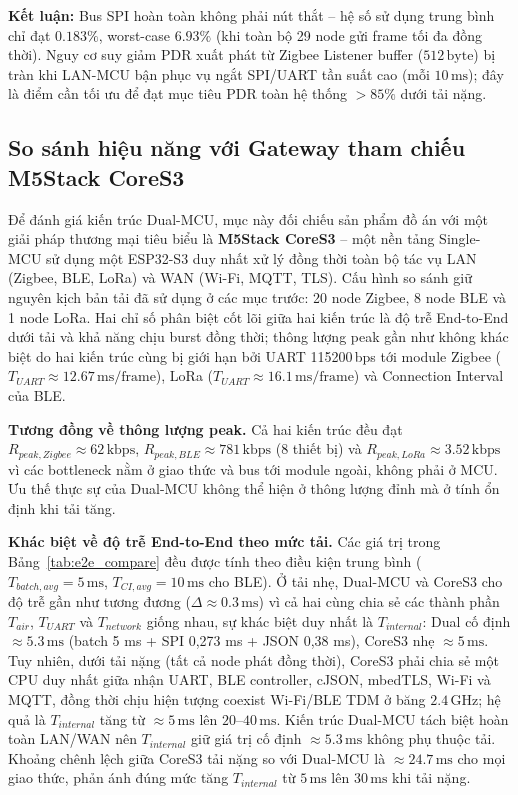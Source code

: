         \textbf{Kết luận:} Bus SPI hoàn toàn không phải nút thắt -- hệ số sử dụng trung bình chỉ đạt $0{.}183\%$, worst-case $6{.}93\%$ (khi toàn bộ 29 node gửi frame tối đa đồng thời). Nguy cơ suy giảm PDR xuất phát từ Zigbee Listener buffer ($512\,\text{byte}$) bị tràn khi LAN-MCU bận phục vụ ngắt SPI/UART tần suất cao (mỗi $10\,\text{ms}$); đây là điểm cần tối ưu để đạt mục tiêu PDR toàn hệ thống $> 85\%$ dưới tải nặng.
        
        \subsection{So sánh hiệu năng với Gateway tham chiếu M5Stack CoreS3}
        \label{subsec:perf_compare}
        
        Để đánh giá kiến trúc Dual-MCU, mục này đối chiếu sản phẩm đồ án với một giải pháp thương mại tiêu biểu là \textbf{M5Stack CoreS3} -- một nền tảng Single-MCU sử dụng một ESP32-S3 duy nhất xử lý đồng thời toàn bộ tác vụ LAN (Zigbee, BLE, LoRa) và WAN (Wi-Fi, MQTT, TLS). Cấu hình so sánh giữ nguyên kịch bản tải đã sử dụng ở các mục trước: 20 node Zigbee, 8 node BLE và 1 node LoRa. Hai chỉ số phân biệt cốt lõi giữa hai kiến trúc là độ trễ End-to-End dưới tải và khả năng chịu burst đồng thời; thông lượng peak gần như không khác biệt do hai kiến trúc cùng bị giới hạn bởi UART 115200\,bps tới module Zigbee ($T_{UART} \approx 12{.}67\,\text{ms/frame}$), LoRa ($T_{UART} \approx 16{.}1\,\text{ms/frame}$) và Connection Interval của BLE.
        
        \textbf{Tương đồng về thông lượng peak.} Cả hai kiến trúc đều đạt $R_{peak,Zigbee} \approx 62\,\text{kbps}$, $R_{peak,BLE} \approx 781\,\text{kbps}$ (8 thiết bị) và $R_{peak,LoRa} \approx 3{.}52\,\text{kbps}$ vì các bottleneck nằm ở giao thức và bus tới module ngoài, không phải ở MCU. Ưu thế thực sự của Dual-MCU không thể hiện ở thông lượng đỉnh mà ở tính ổn định khi tải tăng.
        
        \textbf{Khác biệt về độ trễ End-to-End theo mức tải.} Các giá trị trong Bảng~\ref{tab:e2e_compare} đều được tính theo điều kiện trung bình ($T_{batch,avg} = 5\,\text{ms}$, $T_{CI,avg} = 10\,\text{ms}$ cho BLE). Ở tải nhẹ, Dual-MCU và CoreS3 cho độ trễ gần như tương đương ($\Delta \approx 0{.}3\,\text{ms}$) vì cả hai cùng chia sẻ các thành phần $T_{air}$, $T_{UART}$ và $T_{network}$ giống nhau, sự khác biệt duy nhất là $T_{internal}$: Dual cố định $\approx 5{.}3\,\text{ms}$ (batch 5 ms + SPI 0,273 ms + JSON 0,38 ms), CoreS3 nhẹ $\approx 5\,\text{ms}$. Tuy nhiên, dưới tải nặng (tất cả node phát đồng thời), CoreS3 phải chia sẻ một CPU duy nhất giữa nhận UART, BLE controller, cJSON, mbedTLS, Wi-Fi và MQTT, đồng thời chịu hiện tượng coexist Wi-Fi/BLE TDM ở băng $2{.}4\,\text{GHz}$; hệ quả là $T_{internal}$ tăng từ $\approx 5\,\text{ms}$ lên $20$--$40\,\text{ms}$. Kiến trúc Dual-MCU tách biệt hoàn toàn LAN/WAN nên $T_{internal}$ giữ giá trị cố định $\approx 5{.}3\,\text{ms}$ không phụ thuộc tải. Khoảng chênh lệch giữa CoreS3 tải nặng so với Dual-MCU là $\approx 24{.}7\,\text{ms}$ cho mọi giao thức, phản ánh đúng mức tăng $T_{internal}$ từ $5\,\text{ms}$ lên $30\,\text{ms}$ khi tải nặng.
        
